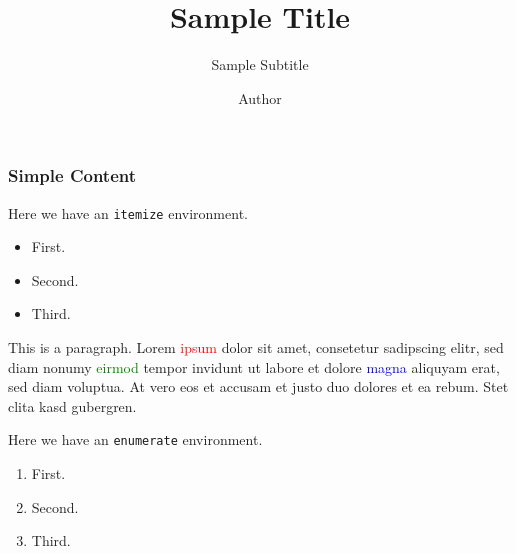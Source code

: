 \title{Sample Title}
\subtitle{Sample Subtitle}
\author{Author}



	\setsecondayrtitlepage
	\begin{frame}
		\titlepage
	\end{frame}

	\setprimarytitlepage
	\begin{frame}
		\titlepage
	\end{frame}

	\begin{frame}
		\frametitle{Simple Content}
		Here we have an \texttt{itemize} environment.
		\begin{itemize}
			\item First.
			\item Second.
			\item Third.
		\end{itemize}
		\vspace{1em}

		This is a paragraph. Lorem \textcolor{red}{ipsum} dolor sit amet, consetetur sadipscing elitr, sed diam nonumy \textcolor{green}{eirmod} tempor invidunt ut labore et dolore \textcolor{blue}{magna} aliquyam erat, sed diam voluptua. At vero eos et accusam et justo duo dolores et ea rebum. Stet clita kasd gubergren.
		\vspace{1em}

		Here we have an \texttt{enumerate} environment.
		\begin{enumerate}
			\item First.
			\item Second.
			\item Third.
		\end{enumerate}
	\end{frame}

